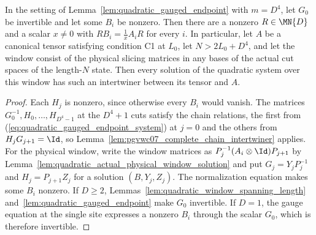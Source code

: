 \begin{lemma}
    \label{lem:quadratic_gauged_complete_chain}
    \leanok
    In the setting of Lemma~\ref{lem:quadratic_gauged_endpoint} with
    $m=D^4$, let $G_0$ be invertible and let some $B_i$ be nonzero. Then
    there are a nonzero $R\in\MN{D}$ and a scalar $x\ne0$ with
    $RB_i=\tfrac1xA_iR$ for every $i$. In particular, let $A$ be a canonical
    tensor satisfying condition C1 at $L_0$, let $N>2L_0+D^4$, and let the
    window consist of the physical slicing matrices in any bases of the
    actual cut spaces of the length-$N$ state. Then every solution of the
    quadratic system over this window has such an intertwiner between its
    tensor and $A$.
\end{lemma}
\begin{proof}
    \leanok
    Each $H_j$ is nonzero, since otherwise every $B_i$ would vanish. The
    matrices $G_0^{-1},H_0,\ldots,H_{D^4-1}$ at the $D^4+1$ cuts satisfy
    the chain relations, the first from
    (\ref{eq:quadratic_gauged_endpoint_system}) at $j=0$ and the others from
    $H_jG_{j+1}=\Id$, so Lemma~\ref{lem:pgvwc07_complete_chain_intertwiner}
    applies. For the physical window, write the window matrices as
    $P_j^{-1}(A_i\otimes\Id)P_{j+1}$ by
    Lemma~\ref{lem:quadratic_actual_physical_window_solution} and put
    $G_j=Y_jP_j^{-1}$ and $H_j=P_{j+1}Z_j$ for a solution $(B,Y_j,Z_j)$.
    The normalization equation makes some $B_i$ nonzero. If $D\ge2$,
    Lemmas~\ref{lem:quadratic_window_spanning_length}
    and~\ref{lem:quadratic_gauged_endpoint} make $G_0$ invertible. If $D=1$,
    the gauge equation at the single site expresses a nonzero $B_i$ through
    the scalar $G_0$, which is therefore invertible.
\end{proof}
